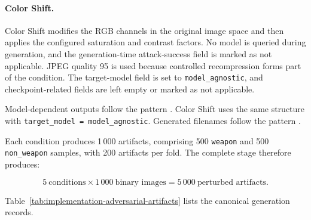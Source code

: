 \paragraph{Color Shift.}

Color Shift modifies the RGB channels in the original image space and then
applies the configured saturation and contrast factors. No model is queried
during generation, and the generation-time attack-success field is marked as
not applicable. JPEG quality 95 is used because controlled recompression forms
part of the condition. The target-model field is set to
\texttt{model\_agnostic}, and checkpoint-related fields are left empty or
marked as not applicable.

Model-dependent outputs follow the pattern
.
Color Shift uses the same structure with
\texttt{target\_model = model\_agnostic}. Generated filenames follow the pattern
.

Each condition produces 1\,000 artifacts, comprising 500
\texttt{weapon} and 500 \texttt{non\_weapon} samples, with 200 artifacts per
fold. The complete stage therefore produces:

\begin{equation}
5\ \text{conditions}
\times
1\,000\ \text{binary images}
=
5\,000\ \text{perturbed artifacts}.
\end{equation}

Table~\ref{tab:implementation-adversarial-artifacts} lists the canonical
generation records.

